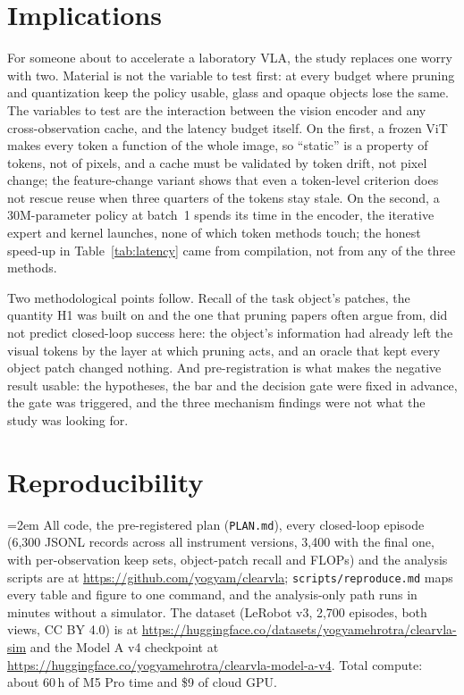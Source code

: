 \documentclass[11pt]{article}
\begin{document}
\section{Implications}
\label{sec:implications}

For someone about to accelerate a laboratory VLA, the study replaces one worry with two. Material is not the variable to test first: at every budget where pruning and quantization keep the policy usable, glass and opaque objects lose the same. The variables to test are the interaction between the vision encoder and any cross-observation cache, and the latency budget itself. On the first, a frozen ViT makes every token a function of the whole image, so ``static'' is a property of tokens, not of pixels, and a cache must be validated by token drift, not pixel change; the feature-change variant shows that even a token-level criterion does not rescue reuse when three quarters of the tokens stay stale. On the second, a 30M-parameter policy at batch~1 spends its time in the encoder, the iterative expert and kernel launches, none of which token methods touch; the honest speed-up in Table~\ref{tab:latency} came from compilation, not from any of the three methods.

Two methodological points follow. Recall of the task object's patches, the quantity H1 was built on and the one that pruning papers often argue from, did not predict closed-loop success here: the object's information had already left the visual tokens by the layer at which pruning acts, and an oracle that kept every object patch changed nothing. And pre-registration is what makes the negative result usable: the hypotheses, the bar and the decision gate were fixed in advance, the gate was triggered, and the three mechanism findings were not what the study was looking for.

\section*{Reproducibility}

{\raggedright\emergencystretch=2em
All code, the pre-registered plan (\texttt{PLAN.md}), every closed-loop episode (6,300 JSONL records across all instrument versions, 3,400 with the final one, with per-observation keep sets, object-patch recall and FLOPs) and the analysis scripts are at \url{https://github.com/yogyam/clearvla}; \texttt{scripts/reproduce.md} maps every table and figure to one command, and the analysis-only path runs in minutes without a simulator. The dataset (LeRobot v3, 2,700 episodes, both views, CC BY 4.0) is at \url{https://huggingface.co/datasets/yogyamehrotra/clearvla-sim} and the Model A v4 checkpoint at \url{https://huggingface.co/yogyamehrotra/clearvla-model-a-v4}. Total compute: about 60\,h of M5 Pro time and \$9 of cloud GPU.
\par}
\end{document}
